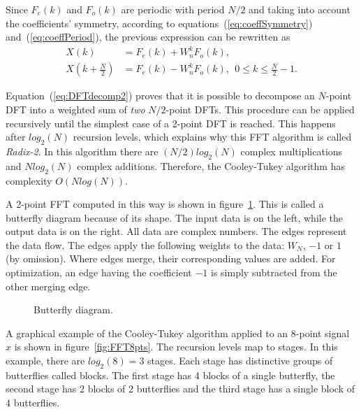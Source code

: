 Since $F_e(k)$ and $F_o(k)$ are periodic with period $N/2$ and taking
into account the coefficients' symmetry, according to
equations~(\ref{eq:coeffSymmetry}) and~(\ref{eq:coeffPeriod}), the
previous expression can be rewritten as
\begin{equation}
\begin{split}
X(k) & =  F_e(k)+W_n^k F_o(k), \\
X \left ( k+\frac{N}{2} \right ) & =  F_e(k)-W_n^k F_o(k), \ \ 0\leq k\leq \frac{N}{2}-1.
\end{split}
\label{eq:DFTdecomp2}
\end{equation}

Equation~(\ref{eq:DFTdecomp2}) proves that it is possible to decompose
an $N$-point DFT into a weighted sum of {\em two} $N/2$-point
DFTs. This procedure can be applied recursively until the simplest
case of a 2-point DFT is reached. This happens after $log_2(N)$
recursion levels, which explains why this FFT algorithm is called {\em
  Radix-2}. In this algorithm there are $(N/2)log_2(N)$ complex
multiplications and $Nlog_2(N)$ complex additions. Therefore, the
Cooley-Tukey algorithm has complexity $O(Nlog(N))$.

A 2-point FFT computed in this way is shown in
figure~\ref{fig:FFTButterfly}. This is called a butterfly diagram
because of its shape. The input data is on the left, while the output
data is on the right. All data are complex numbers. The edges
represent the data flow. The edges apply the following weights to the
data: $W_N$, $-1$ or $1$ (by omission). Where edges merge, their
corresponding values are added. For optimization, an edge having the
coefficient $-1$ is simply subtracted from the other merging edge.

\begin{figure}[!htb]
	\caption{Butterfly diagram.}
	\label{fig:FFTButterfly}
\end{figure}

A graphical example of the Cooley-Tukey algorithm applied to an
8-point signal $x$ is shown in figure~\ref{fig:FFT8pts}. The recursion
levels map to stages. In this example, there are $log_2(8)=3$
stages. Each stage has distinctive groups of butterflies called
blocks. The first stage has 4 blocks of a single butterfly, the second
stage has 2 blocks of 2 butterflies and the third stage has a single
block of 4 butterflies.

